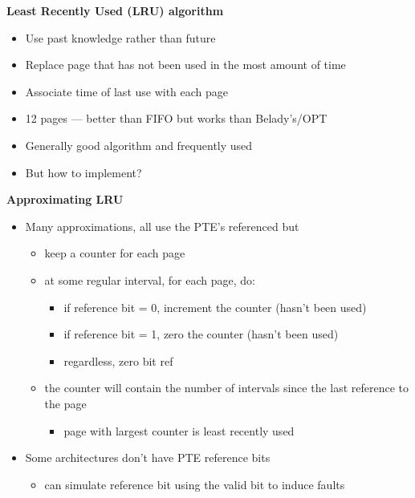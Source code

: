 \documentclass[11pt,a4paper]{article}
\begin{document}
\textbf{Least Recently Used (LRU) algorithm}
\begin{itemize}
    \item Use past knowledge rather than future
    \item Replace page that has not been used in the most amount of time
    \item Associate time of last use with each page
    \item 12 pages --- better than FIFO but works than Belady's/OPT
    \item Generally good algorithm and frequently used
    \item But how to implement?
\end{itemize}

\textbf{Approximating LRU}
\begin{itemize}
    \item Many approximations, all use the PTE's referenced but
        \begin{itemize}
            \item keep a counter for each page
            \item at some regular interval, for each page, do:
                \begin{itemize}
                    \item if reference bit = 0, increment the counter (hasn't been used)
                    \item if reference bit = 1, zero the counter (hasn't been used)
                    \item regardless, zero bit ref
                \end{itemize}
            \item the counter will contain the number of intervals since the last reference to
                the page
                \begin{itemize}
                    \item page with largest counter is least recently used
                \end{itemize}
        \end{itemize}
    \item Some architectures don't have PTE reference bits
        \begin{itemize}
            \item can simulate reference bit using the valid bit to induce faults
        \end{itemize}
\end{itemize}
\end{document}
